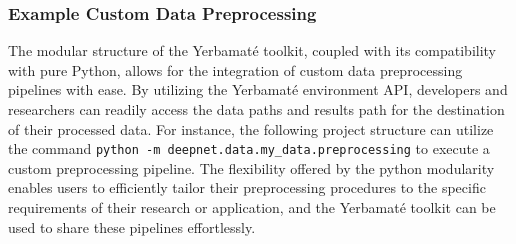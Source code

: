 \documentclass{article}
\begin{document}
\subsubsection{Example Custom Data Preprocessing}
The modular structure of the Yerbamaté toolkit, coupled with its compatibility with pure Python, allows for the integration of custom data preprocessing pipelines with ease. By utilizing the Yerbamaté environment API, developers and researchers can readily access the data paths and results path for the destination of their processed data. For instance, the following project structure can utilize the command \texttt{python -m deepnet.data.my\_data.preprocessing} to execute a custom preprocessing pipeline. The flexibility offered by the python modularity enables users to efficiently tailor their preprocessing procedures to the specific requirements of their research or application, and the Yerbamaté toolkit can be used to share these pipelines effortlessly.

\end{document}
